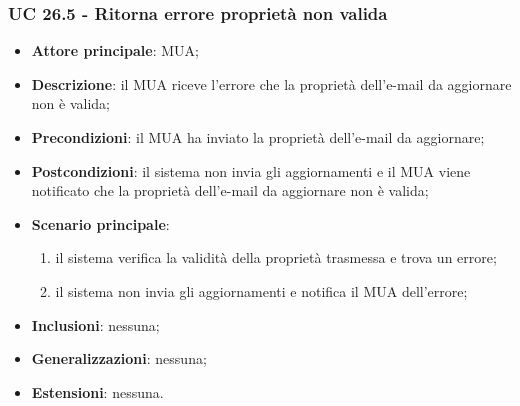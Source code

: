     \subsubsection{UC 26.5 - Ritorna errore proprietà non valida} \label{sec:UC26.5}
    \begin{itemize}
        \item \textbf{Attore principale}: MUA;
        \item \textbf{Descrizione}: il MUA riceve l'errore che la proprietà dell'e-mail da aggiornare non è valida;
        \item \textbf{Precondizioni}: il MUA ha inviato la proprietà dell'e-mail da aggiornare;
        \item \textbf{Postcondizioni}: il sistema non invia gli aggiornamenti e il MUA viene notificato che la proprietà dell'e-mail da aggiornare non è valida;
        \item \textbf{Scenario principale}:
            \begin{enumerate}
                \item il sistema verifica la validità della proprietà trasmessa e trova un errore;
                \item il sistema non invia gli aggiornamenti e notifica il MUA dell'errore;
            \end{enumerate}
        \item \textbf{Inclusioni}: nessuna;
        \item \textbf{Generalizzazioni}: nessuna;
        \item \textbf{Estensioni}: nessuna.
    \end{itemize}
